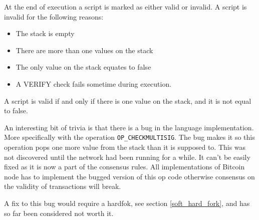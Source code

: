 \label{script_valid}
At the end of execution a script is marked as either valid or invalid. A script is invalid for the following reasons:

\begin{itemize}
	\item The stack is empty
	\item There are more than one values on the stack
	\item The only value on the stack equates to false
	\item A VERIFY check fails sometime during execution.
\end{itemize}

A script is valid if and only if there is one value on the stack, and it is not equal to false.

An interesting bit of trivia is that there is a bug in the language implementation. More specifically with the operation \texttt{OP\_CHECKMULTISIG}. The bug makes it so this operation pops one more value from the stack than it is supposed to. This was not discovered until the network had been running for a while. It can't be easily fixed as it is now a part of the consensus rules. All implementations of Bitcoin node has to implement the bugged version of this op code otherwise consensus on the validity of transactions will break.

A fix to this bug would require a hardfok, see section \ref{soft_hard_fork}, and has so far been considered not worth it.
